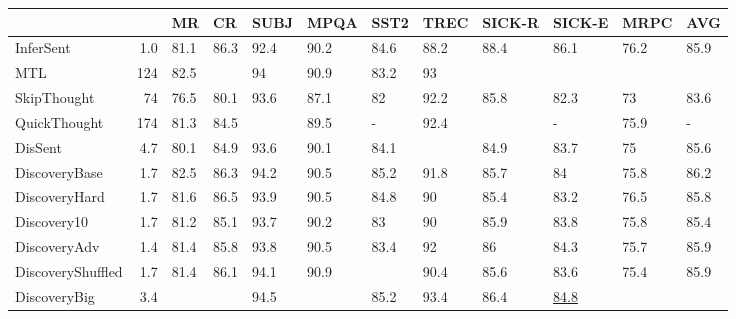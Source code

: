 \documentclass[11pt,a4paper]{article}
\begin{document}
\begin{table*}[htb]
\begin{small}
\centering
\begin{tabular}{lrllllllllll}
\toprule
{} &       &               MR &                  CR &             SUBJ &             MPQA &             SST2 &             TREC &     SICK-R &   SICK-E &                MRPC &               AVG \\
\midrule
InferSent         &    1.0 &             81.1 &                86.3 &             92.4 &             90.2 &             84.6 &             88.2 &                88.4 &             86.1 &                76.2 &                85.9 \\
MTL               &  124 &             82.5 &      &               94 &             90.9 &             83.2 &               93 &      &   &      &      \\
\midrule
SkipThought       &   74&             76.5 &                80.1 &             93.6 &             87.1 &               82 &             92.2 &                85.8 &             82.3 &                  73 &                83.6 \\
QuickThought      &  174 &             81.3 &                84.5 &   &             89.5 &              - &             92.4 &   &              - &                75.9 &               - \\
DisSent           &    4.7 &             80.1 &                84.9 &             93.6 &             90.1 &             84.1 &   &                84.9 &             83.7 &                  75 &                85.6 \\
DiscoveryBase         &    1.7 &             82.5 &                86.3 &             94.2 &             90.5 &             85.2 &             91.8 &                85.7 &               84 &                75.8 &                86.2 \\
DiscoveryHard     &    1.7 &             81.6 &                86.5 &             93.9 &             90.5 &             84.8 &               90 &                85.4 &             83.2 &                76.5 &                85.8 \\
Discovery10       &    1.7 &             81.2 &                85.1 &             93.7 &             90.2 &               83 &               90 &                85.9 &             83.8 &                75.8 &                85.4 \\
DiscoveryAdv      &    1.4 &             81.4 &                85.8 &             93.8 &             90.5 &             83.4 &               92 &                  86 &             84.3 &                75.7 &                85.9 \\
DiscoveryShuffled &    1.7 &             81.4 &                86.1 &             94.1 &             90.9 &   &             90.4 &                85.6 &             83.6 &                75.4 &                85.9 \\
DiscoveryBig      &    3.4 &   &   &             94.5 &   &             85.2 &             93.4 &                86.4 &             \underline{84.8} &   &   \\
\bottomrule
\end{tabular}


\end{small}
\end{table*}
\end{document}
